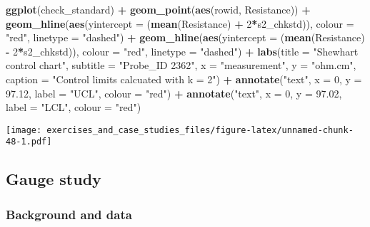 \documentclass[]{book}
\newenvironment{Shaded}{\begin{snugshade}}{\end{snugshade}}
\newcommand{\DataTypeTok}[1]{\textcolor[rgb]{0.13,0.29,0.53}{#1}}
\newcommand{\DecValTok}[1]{\textcolor[rgb]{0.00,0.00,0.81}{#1}}
\newcommand{\FloatTok}[1]{\textcolor[rgb]{0.00,0.00,0.81}{#1}}
\newcommand{\KeywordTok}[1]{\textcolor[rgb]{0.13,0.29,0.53}{\textbf{#1}}}
\newcommand{\NormalTok}[1]{#1}
\newcommand{\OperatorTok}[1]{\textcolor[rgb]{0.81,0.36,0.00}{\textbf{#1}}}
\newcommand{\StringTok}[1]{\textcolor[rgb]{0.31,0.60,0.02}{#1}}
\theoremstyle{definition}
\theoremstyle{definition}
\theoremstyle{definition}
\theoremstyle{remark}
\begin{document}
\begin{Shaded}
\begin{Highlighting}[]
\KeywordTok{ggplot}\NormalTok{(check_standard) }\OperatorTok{+}
\StringTok{  }\KeywordTok{geom_point}\NormalTok{(}\KeywordTok{aes}\NormalTok{(rowid, Resistance)) }\OperatorTok{+}
\StringTok{  }\KeywordTok{geom_hline}\NormalTok{(}\KeywordTok{aes}\NormalTok{(}\DataTypeTok{yintercept =}\NormalTok{ (}\KeywordTok{mean}\NormalTok{(Resistance) }\OperatorTok{+}\StringTok{ }\DecValTok{2}\OperatorTok{*}\NormalTok{s2_chkstd)), }\DataTypeTok{colour =} \StringTok{"red"}\NormalTok{, }\DataTypeTok{linetype =} \StringTok{"dashed"}\NormalTok{) }\OperatorTok{+}
\StringTok{  }\KeywordTok{geom_hline}\NormalTok{(}\KeywordTok{aes}\NormalTok{(}\DataTypeTok{yintercept =}\NormalTok{ (}\KeywordTok{mean}\NormalTok{(Resistance) }\OperatorTok{-}\StringTok{ }\DecValTok{2}\OperatorTok{*}\NormalTok{s2_chkstd)), }\DataTypeTok{colour =} \StringTok{"red"}\NormalTok{, }\DataTypeTok{linetype =} \StringTok{"dashed"}\NormalTok{) }\OperatorTok{+}
\StringTok{  }\KeywordTok{labs}\NormalTok{(}\DataTypeTok{title =}  \StringTok{"Shewhart control chart"}\NormalTok{, }\DataTypeTok{subtitle =} \StringTok{"Probe_ID 2362"}\NormalTok{, }\DataTypeTok{x =} \StringTok{"measurement"}\NormalTok{, }\DataTypeTok{y =} \StringTok{"ohm.cm"}\NormalTok{, }\DataTypeTok{caption =} \StringTok{"Control limits calcuated with k = 2"}\NormalTok{) }\OperatorTok{+}
\StringTok{  }\KeywordTok{annotate}\NormalTok{(}\StringTok{"text"}\NormalTok{, }\DataTypeTok{x =} \DecValTok{0}\NormalTok{, }\DataTypeTok{y =} \FloatTok{97.12}\NormalTok{, }\DataTypeTok{label =} \StringTok{"UCL"}\NormalTok{, }\DataTypeTok{colour =} \StringTok{"red"}\NormalTok{) }\OperatorTok{+}
\StringTok{  }\KeywordTok{annotate}\NormalTok{(}\StringTok{"text"}\NormalTok{, }\DataTypeTok{x =} \DecValTok{0}\NormalTok{, }\DataTypeTok{y =} \FloatTok{97.02}\NormalTok{, }\DataTypeTok{label =} \StringTok{"LCL"}\NormalTok{, }\DataTypeTok{colour =} \StringTok{"red"}\NormalTok{)}
\end{Highlighting}
\end{Shaded}

\texttt{[image: exercises\_and\_case\_studies\_files/figure-latex/unnamed-chunk-48-1.pdf]}

\hypertarget{gauge-study}{%
\subsection{Gauge study}\label{gauge-study}}

\hypertarget{background-and-data-1}{%
\subsubsection{Background and data}\label{background-and-data-1}}
\end{document}
